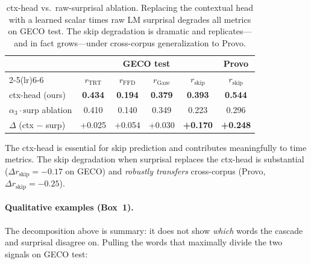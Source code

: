 \documentclass[11pt]{article}
\begin{document}
\begin{table}[h]
\centering
\small
\begin{tabular}{lcccc@{\hskip 12pt}c}
\toprule
& \multicolumn{4}{c}{\textbf{GECO test}} & \textbf{Provo} \\
\cmidrule(lr){2-5}\cmidrule(lr){6-6}
& $r_{\text{TRT}}$ & $r_{\text{FFD}}$ & $r_{\text{Gaze}}$ & $r_{\text{skip}}$ & $r_{\text{skip}}$ \\
\midrule
ctx-head (ours)  & \textbf{0.434} & \textbf{0.194} & \textbf{0.379} & \textbf{0.393} & \textbf{0.544} \\
$\alpha_3 \cdot \text{surp}$ ablation & 0.410 & 0.140 & 0.349 & 0.223 & 0.296 \\
\midrule
$\Delta$ (ctx $-$ surp) & +0.025 & +0.054 & +0.030 & \textbf{+0.170} & \textbf{+0.248} \\
\bottomrule
\end{tabular}
\caption{ctx-head vs.\ raw-surprisal ablation. Replacing the contextual head with a learned scalar times raw LM surprisal degrades all metrics on GECO test. The skip degradation is dramatic and replicates---and in fact grows---under cross-corpus generalization to Provo.}
\label{tab:ctxsurp}
\end{table}

The ctx-head is essential for skip prediction and contributes meaningfully to time metrics. The skip degradation when surprisal replaces the ctx-head is substantial ($\Delta r_{\text{skip}} = -0.17$ on GECO) and \emph{robustly transfers} cross-corpus (Provo, $\Delta r_{\text{skip}} = -0.25$).

\paragraph{Qualitative examples (Box~1).} The decomposition above is summary: it does not show \emph{which} words the cascade and surprisal disagree on. Pulling the words that maximally divide the two signals on GECO test:
\end{document}
